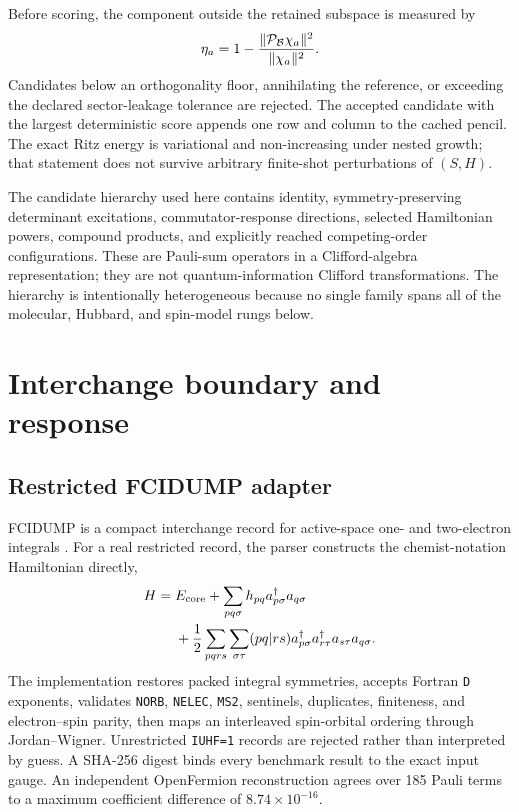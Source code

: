 \documentclass[aps,pra,reprint,superscriptaddress,nofootinbib,floatfix]{revtex4-2}
\begin{document}
Before scoring, the component outside the retained subspace is measured by
\begin{equation}
 \eta_a =
 1-\frac{\|{\cal P}_{\mathcal B}\chi_a\|^2}{\|\chi_a\|^2}.
 \label{eq:orthogonal-fraction}
\end{equation}
Candidates below an orthogonality floor, annihilating the reference, or
exceeding the declared sector-leakage tolerance are rejected.  The accepted
candidate with the largest deterministic score appends one row and column to
the cached pencil.  The exact Ritz energy is variational and non-increasing
under nested growth; that statement does not survive arbitrary finite-shot
perturbations of $(S,H)$.

The candidate hierarchy used here contains identity, symmetry-preserving
determinant excitations, commutator-response directions, selected Hamiltonian
powers, compound products, and explicitly reached competing-order
configurations.  These are Pauli-sum operators in a Clifford-algebra
representation; they are not quantum-information Clifford transformations.
The hierarchy is intentionally heterogeneous because no single family spans
all of the molecular, Hubbard, and spin-model rungs below.

\section{Interchange boundary and response}
\label{sec:boundary-response}

\subsection{Restricted FCIDUMP adapter}
\label{sec:fcidump}

FCIDUMP is a compact interchange record for active-space one- and two-electron
integrals \cite{knowles1989fcidump}.  For a real restricted record, the parser
constructs the chemist-notation Hamiltonian directly,
\begin{align}
 H={}&E_{\rm core}
 +\sum_{pq\sigma}h_{pq}a^\dagger_{p\sigma}a_{q\sigma}\nonumber\\
 &+\frac12\sum_{pqrs}\sum_{\sigma\tau}(pq|rs)
 a^\dagger_{p\sigma}a^\dagger_{r\tau}a_{s\tau}a_{q\sigma}.
 \label{eq:fcidump-h}
\end{align}
The implementation restores packed integral symmetries, accepts Fortran
\texttt{D} exponents, validates \texttt{NORB}, \texttt{NELEC},
\texttt{MS2}, sentinels, duplicates, finiteness, and electron--spin parity,
then maps an interleaved spin-orbital ordering through Jordan--Wigner.
Unrestricted \texttt{IUHF=1} records are rejected rather than interpreted by
guess.  A SHA-256 digest binds every benchmark result to the exact input
gauge.  An independent OpenFermion reconstruction
\cite{mcclean2020openfermion} agrees over 185 Pauli terms to a maximum
coefficient difference of $8.74\times10^{-16}$.
\end{document}

